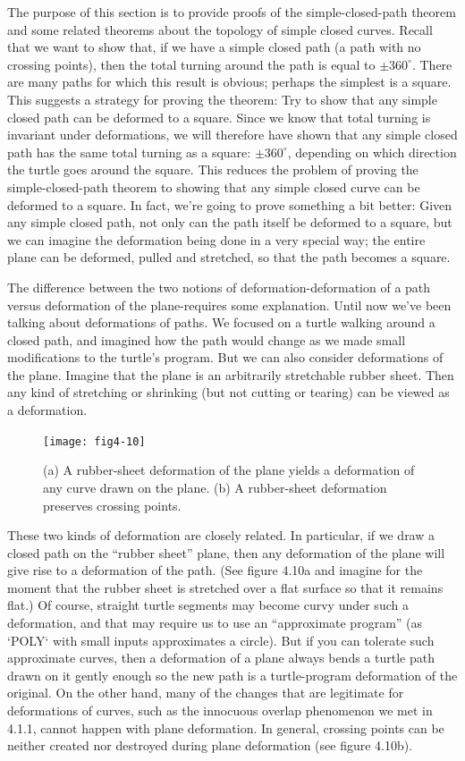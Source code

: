\documentclass{book}
\begin{document}
The purpose of this section is to provide proofs of the simple-closed-path
theorem and some related theorems about the topology of simple closed
curves. Recall that we want to show that, if we have a simple closed
path (a path with no crossing points), then the total turning around the
path is equal to $\pm 360^{\circ}$. There are many paths for which this result
is obvious; perhaps the simplest is a square. This suggests a strategy
for proving the theorem: Try to show that any simple closed path can
be deformed to a square. Since we know that total turning is invariant
under deformations, we will therefore have shown that any simple closed
path has the same total turning as a square: $\pm 360^{\circ}$, depending on which
direction the turtle goes around the square. This reduces the problem
of proving the simple-closed-path theorem to showing that any simple
closed curve can be deformed to a square. In fact, we're going to prove
something a bit better: Given any simple closed path, not only can the
path itself be deformed to a square, but we can imagine the deformation
being done in a very special way; the entire plane can be deformed,
pulled and stretched, so that the path becomes a square.

The difference between the two notions of deformation-deformation
of a path versus deformation of the plane-requires some explanation.
Until now we've been talking about deformations of paths. We focused
on a turtle walking around a closed path, and imagined how the path
would change as we made small modifications to the turtle's program.
But we can also consider deformations of the plane. Imagine that the
plane is an arbitrarily stretchable rubber sheet. Then any kind of
stretching or shrinking (but not cutting or tearing) can be viewed as
a deformation.

\begin{figure}
\begin{center}
\texttt{[image: fig4-10]}
\caption{(a) A rubber-sheet deformation of the plane yields a deformation of any curve drawn on the plane. (b) A rubber-sheet deformation preserves crossing points.}
\end{center}
\end{figure}

These two kinds of deformation are closely related. In particular, if we
draw a closed path on the ``rubber sheet'' plane, then any deformation
of the plane will give rise to a deformation of the path. (See figure
4.10a and imagine for the moment that the rubber sheet is stretched
over a flat surface so that it remains flat.) Of course, straight turtle
segments may become curvy under such a deformation, and that may
require us to use an ``approximate program'' (as \textsc{`POLY`} with small inputs
approximates a circle). But if you can tolerate such approximate curves,
then a deformation of a plane always bends a turtle path drawn on it
gently enough so the new path is a turtle-program deformation of the
original. On the other hand, many of the changes that are legitimate for
deformations of curves, such as the innocuous overlap phenomenon we
met in 4.1.1, cannot happen with plane deformation. In general, crossing
points can be neither created nor destroyed during plane deformation
(see figure 4.10b).
\end{document}
